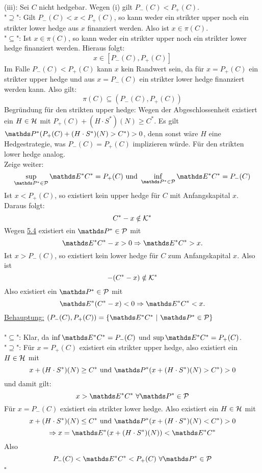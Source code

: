 (iii):
Sei $C$ nicht hedgebar.
Wegen (i) gilt $P_-(C)<P_+(C)$.\\
"$\supseteq$":
Gilt $P_-(C)<x<P_+(C)$, so kann weder ein strikter upper noch ein strikter lower hedge aus $x$ finanziert werden.
Also ist $x\in \pi(C)$.\\
"$\subseteq$":
Ist $x\in\pi(C)$, so kann weder ein strikter upper noch ein strikter lower hedge finanziert werden.
Hieraus folgt:
\[
x\in [P_-(C),P_+(C)]
\]
Im Falle $P_-(C)<P_+(C)$ kann $x$ kein Randwert sein, da für $x=P_+(C)$ ein strikter upper hedge und aus $x=P_-(C)$ ein strikter lower hedge finanziert werden kann.
Also gilt:
\[
\pi(C)\subseteq (P_-(C),P_+(C))
\]
Begründung für den strikten upper hedge:
Wegen der Abgeschlossenheit existiert ein $H\in\mathcal{H}$ mit $P_+(C)+(H\cdot S^*)(N)\ge C^*$.
Es gilt $\Pw^*(P_+(C)+(H\cdot S^*)(N)>C^*)>0$, denn sonst wäre $H$ eine Hedgestrategie, was $P_-(C)=P_+(C)$ implizieren würde.
Für den strikten lower hedge analog.\\

Zeige weiter:
\[
\sup\limits_{\Pw^*\in\mc{P}}\E^*C^*=P_+(C) \text{ und } \inf\limits_{\Pw^*\in\mc{P}}\E^*C^*=P_-(C)
\]
Ist $x<P_+(C)$, so existiert kein upper hedge für $C$ mit Anfangskapital $x$.
Daraus folgt:
\[
C^*-x\notin \mathcal{K}^*
\]
Wegen \hyperref[sub:satz_4fima]{5.4} existiert ein $\Pw^*\in\mc{P}$ mit
\[
\E^*C^*-x>0\Rightarrow \E^*C^*>x.
\]
Ist $x>P_-(C)$, so existiert kein lower hedge für $C$ zum Anfangskapital $x$.
Also ist
\[
-(C^*-x)\notin \mathcal{K}^*
\]
Also existiert ein $\Pw^*\in\mc{P}$ mit 
\[
\E^*(C^*-x)<0 \Rightarrow \E^*C^*<x.
\]
\uline{Behauptung:}
$(P_-(C),P_+(C))=\penbrace{\E^*C^*~|~\Pw^*\in\mc{P}}$\\

\\
"$\subseteq$":
Klar, da $\inf \E^*C^*=P_-(C)$ und $\sup\E^*C^*=P_+(C)$.\\
"$\supseteq$":
Für $x=P_+(C)$ existiert ein strikter upper hedge, also existiert ein $H\in\mathcal{H}$ mit 
\[
x+(H\cdot S^*)(N)\ge C^* \text{ und }\Pw^*(x+(H\cdot S^*)(N)>C^*)>0
\]
und damit gilt:
\[
x>\E^*C^*~\forall \Pw^*\in\mc{P}
\]
Für $x=P_-(C)$ existiert ein strikter lower hedge.
Also existiert ein $H\in\mathcal{H}$ mit
\[
x+(H\cdot S^*)(N)\le C^* \text{ und } \Pw^*(x+(H\cdot S^*)(N)<C^*)>0
\]
\[
\Rightarrow x=\E^*(x+(H\cdot S^*)(N))<\E^*C^*
\]
Also
\[
P_-(C)<\E^*C^*<P_+(C)~\forall \Pw^*\in\mc{P}
\]
\hfill $\square$

